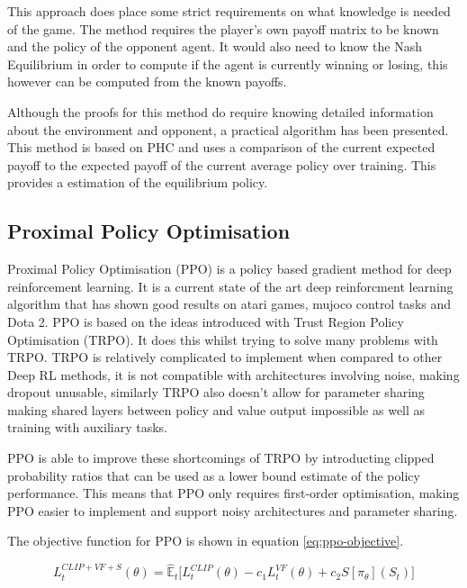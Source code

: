 \documentclass[conference]{IEEEtran}
\begin{document}
This approach does place some strict requirements on what knowledge is needed of the game. The method requires the player's own payoff matrix to be known and the policy of the opponent agent. It would also need to know the Nash Equilibrium in order to compute if the agent is currently winning or losing, this however can be computed from the known payoffs.

Although the proofs for this method do require knowing detailed information about the environment and opponent, a practical algorithm has been presented. This method is based on PHC and uses a comparison of the current expected payoff to the expected payoff of the current average policy over training. This provides a estimation of the equilibrium policy.

\subsection{Proximal Policy Optimisation}

Proximal Policy Optimisation (PPO) is a policy based gradient method for deep reinforcement learning. It is a current state of the art deep reinforcment learning algorithm that has shown good results on atari games, mujoco control tasks\cite{schulman2017proximal} and Dota 2\cite{OpenAI_dota}. PPO is based on the ideas introduced with Trust Region Policy Optimisation (TRPO)\cite{schulman2015trust}. It does this whilst trying to solve many problems with TRPO. TRPO is relatively complicated to implement when compared to other Deep RL methods, it is not compatible with architectures involving noise, making dropout unusable, similarly TRPO also doesn't allow for parameter sharing making shared layers between policy and value output impossible as well as training with auxiliary tasks.

PPO is able to improve these shortcomings of TRPO by introducting clipped probability ratios that can be used as a lower bound estimate of the policy performance. This means that PPO only requires first-order optimisation, making PPO easier to implement and support noisy architectures and parameter sharing. 

The objective function for PPO is shown in equation \ref{eq:ppo-objective}.

\begin{equation}
    L_t^{CLIP+VF+S}(\theta) = \hat{\mathbb{E}}_t\big[L_t^{CLIP}(\theta)-c_1L_t^{VF}(\theta)+c_2S[\pi_{\theta}](S_t)\big]
    \label{eq:ppo-objective}
\end{equation}
\end{document}
